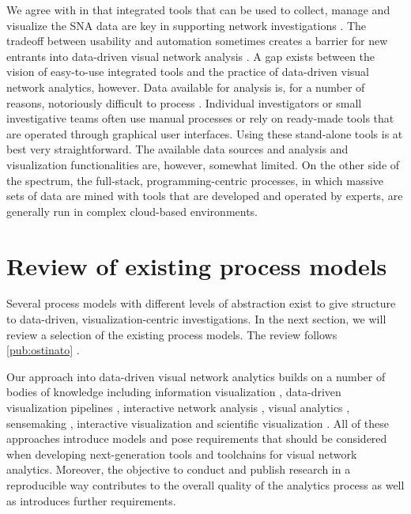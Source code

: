We agree with \cite{Freeman2000VisualizingNetworks} in that integrated tools that can be used to collect, manage and visualize the SNA data are key in supporting network investigations \cite[cf.][]{Huhtamaki2010Context-DrivenCo-Creation}. The tradeoff between usability and automation sometimes creates a barrier for new entrants into data-driven visual network analysis \citep{Hansen2012DoData}. A gap exists between the vision of easy-to-use integrated tools and the practice of data-driven visual network analytics, however. Data available for analysis is, for a number of reasons, notoriously difficult to process \citep{Salonen2013ChallengesMedia}. Individual investigators or  small investigative teams often use manual processes or rely on ready-made tools that are operated through graphical user interfaces. Using these stand-alone tools is at best very straightforward. The available data sources and analysis and visualization functionalities are, however, somewhat limited. On the other side of the spectrum, the full-stack, programming-centric processes, in which massive sets of data are mined with tools that are developed and operated by experts, are generally run in complex cloud-based environments.

\section{Review of existing process models}

Several process models with different levels of abstraction exist to give structure to data-driven, visualization-centric investigations. In the next section, we will review a selection of the existing process models. The review follows \ref{pub:ostinato} \citep{Huhtamaki2015Ostinato:Analytics}.

Our approach into data-driven visual network analytics builds on a number of bodies of knowledge including 
information visualization \citep{Card1999ReadingsThink}, 
data-driven visualization pipelines \citep{Nykanen2008}, 
interactive network analysis \citep{Hansen2012DoData},
visual analytics \citep{Wong2004VisualAnalytics, Keim2010MasteringAnalytics},
sensemaking \citep{Pirolli2005TheAnalysis, Weick2005OrganizingSensemaking},
interactive visualization \citep{Heer2012InteractiveAnalysis} and 
scientific visualization \citep{Telea2008}. All of these approaches introduce models and pose requirements that should be considered when developing next-generation tools and toolchains for visual network analytics. Moreover, the objective to conduct and publish research in a reproducible way \citep{Peng2009,Peng2011, Ghosh2013} contributes to the overall quality of the analytics process as well as introduces further requirements.

